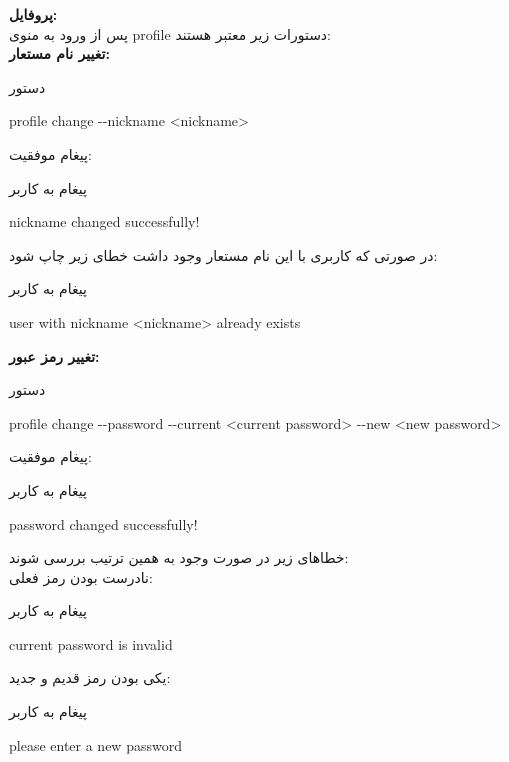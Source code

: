 \documentclass[]{article}
\begin{document}
\vspace{.5cm}
\textbf{پروفایل:}
\\
پس از ورود به منوی profile دستورات زیر معتبر هستند:
\\
\vspace{.5cm}
\textbf{تغییر نام مستعار:}
\begin{mybox}[colback=yellow]{دستور}
	\begin{latin}	
		profile change -{}-nickname <nickname>
	\end{latin}
\end{mybox}
پیغام موفقیت:
\begin{mybox}[colback=yellow]{پیغام به کاربر}
	\begin{latin}	
		nickname changed successfully!
	\end{latin}
\end{mybox}
در صورتی که کاربری با این نام مستعار وجود داشت خطای زیر چاپ شود:
\begin{mybox}[colback=yellow]{پیغام به کاربر}
	\begin{latin}	
		user with nickname <nickname> already exists
	\end{latin}
\end{mybox}

\vspace{.5cm}
\textbf{تغییر رمز عبور:}
\begin{mybox}[colback=yellow]{دستور}
	\begin{latin}	
		profile change -{}-password -{}-current <current password> -{}-new <new 
		password>
	\end{latin}
\end{mybox}
پیغام موفقیت:
\begin{mybox}[colback=yellow]{پیغام به کاربر}
	\begin{latin}	
		password changed successfully!
	\end{latin}
\end{mybox}
خطا‌های زیر در صورت وجود به همین ترتیب بررسی شوند:
\\
نادرست بودن رمز فعلی:
\begin{mybox}[colback=yellow]{پیغام به کاربر}
	\begin{latin}	
		current password is invalid
	\end{latin}
\end{mybox}
یکی بودن رمز قدیم و جدید:
\begin{mybox}[colback=yellow]{پیغام به کاربر}
	\begin{latin}	
		please enter a new password
	\end{latin}
\end{mybox}
\end{document}
